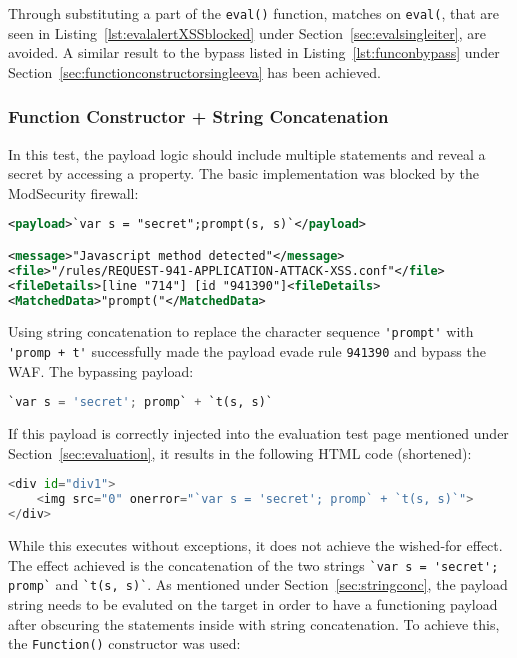 Through substituting a part of the \verb|eval()| function, matches on \verb|eval(|, that are seen in Listing~\ref{lst:evalalertXSSblocked} under Section~\ref{sec:evalsingleiter}, are avoided. A similar result to the bypass listed in Listing~\ref{lst:funconbypass} under Section~\ref{sec:functionconstructorsingleeva} has been achieved.



\subsubsection{Function Constructor + String Concatenation}
\label{sec:funconstrconbypass}
In this test, the payload logic should include multiple statements and reveal a secret by accessing a property.
The basic implementation was blocked by the ModSecurity firewall:

\begin{lstlisting}[style=ruleStyle, language=XML, caption=prompt blocked, label={lst:promptblocked}]
<payload>`var s = "secret";prompt(s, s)`</payload>

<message>"Javascript method detected"</message>
<file>"/rules/REQUEST-941-APPLICATION-ATTACK-XSS.conf"</file>
<fileDetails>[line "714"] [id "941390"]<fileDetails>
<MatchedData>"prompt("</MatchedData>
\end{lstlisting}

Using string concatenation to replace the character sequence \verb|'prompt'| with \verb|'promp + t'| successfully made the payload evade rule \verb|941390| and bypass the WAF. The bypassing payload:

\begin{lstlisting}[style=basicStyle, language=Python]
`var s = 'secret'; promp` + `t(s, s)`
\end{lstlisting}

If this payload is correctly injected into the evaluation test page mentioned under Section~\ref{sec:evaluation}, it results in the following HTML code (shortened):

\begin{lstlisting}[style=basicStyle, language=Python]
<div id="div1">
	<img src="0" onerror="`var s = 'secret'; promp` + `t(s, s)`">
</div>
\end{lstlisting}

While this executes without exceptions, it does not achieve the wished-for effect. The effect achieved is the concatenation of the two strings \verb|`var s = 'secret'; promp`| and \verb|`t(s, s)`|. As mentioned under Section~\ref{sec:stringconc}, the payload string needs to be evaluted on the target in order to have a functioning payload after obscuring the statements inside with string concatenation. To achieve this, the \verb|Function()| constructor was used:

